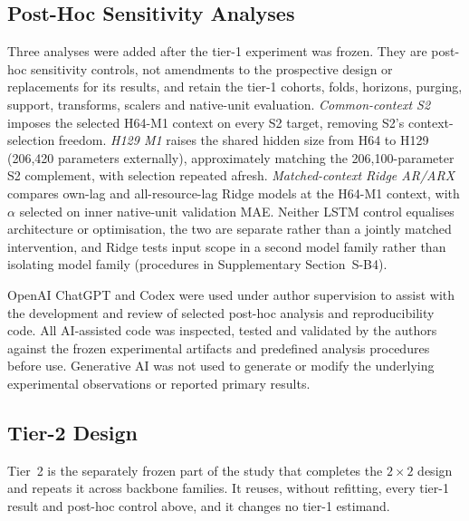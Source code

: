 \documentclass[5p,twocolumn]{elsarticle}
\begin{document}
\subsection{Post-Hoc Sensitivity Analyses}
\label{sec:posthoc-controls}

Three analyses were added after the tier-1 experiment was frozen. They are
post-hoc sensitivity controls, not amendments to the prospective design or
replacements for its results, and retain the tier-1 cohorts, folds, horizons,
purging, support, transforms, scalers and native-unit evaluation.
\emph{Common-context S2} imposes the selected H64-M1 context on every S2 target,
removing S2's context-selection freedom. \emph{H129 M1} raises the shared
hidden size from H64 to H129 (206,420 parameters externally), approximately
matching the 206,100-parameter S2 complement, with selection repeated afresh.
\emph{Matched-context Ridge AR/ARX} compares own-lag and all-resource-lag
Ridge models at the H64-M1 context, with $\alpha$ selected on inner
native-unit validation MAE. Neither LSTM control equalises architecture or
optimisation, the two are separate rather than a jointly matched
intervention, and Ridge tests input scope in a second model family rather
than isolating model family (procedures in Supplementary Section~S-B4).

OpenAI ChatGPT and Codex were used under author supervision to assist with the
development and review of selected post-hoc analysis and reproducibility code.
All AI-assisted code was inspected, tested and validated by the authors against
the frozen experimental artifacts and predefined analysis procedures before
use. Generative AI was not used to generate or modify the underlying
experimental observations or reported primary results.

\subsection{Tier-2 Design}
\label{sec:tier2-design}

Tier~2 is the separately frozen part of the study that completes the $2\times2$ design
and repeats it across backbone families. It reuses, without refitting, every
tier-1 result and post-hoc control above, and it changes no tier-1 estimand.
\end{document}
